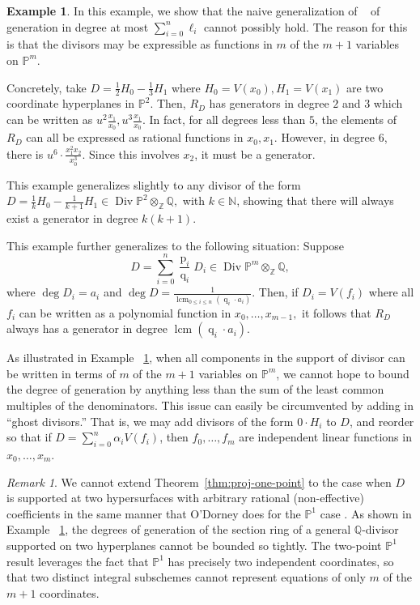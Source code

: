 \documentclass{amsart}
\theoremstyle{plain}
\theoremstyle{definition}
\newtheorem{example}[thm]{Example}
\theoremstyle{remark}
\newtheorem{rem}[thm]{Remark}
\numberwithin{equation}{section}
\newcommand\bn{{\mathbb N}}
\newcommand\bq{{\mathbb Q}}
\newcommand\bp{{\mathbb P}}
\newcommand\bz{{\mathbb Z}}
\DeclareMathOperator\di{Div}
\newcommand\bida{a}
\DeclareMathOperator{\num}{p}
\DeclareMathOperator{\den}{q}
\DeclareMathOperator{\lcm}{lcm}
\begin{document}
\begin{example}
\label{eg:hyperplane}
In this example, we show that the naive generalization of
~\cite[Theorem 8]{dorney:canonical} of generation in degree at most
$\sum_{i=0}^{n}\ell_i$ cannot possibly hold. The reason for this is
that the divisors may be
expressible as functions in $m$ of the $m+1$ variables on $\bp^m$.

Concretely, take $D = \frac{1}{2}H_0 - \frac{1}{3}H_1$ where $H_0 = V(x_0),
H_1 = V(x_1)$ are two coordinate hyperplanes in $\bp^2$. Then, $R_D$
has generators in degree $2$ and $3$ which can be written as $u^2
\frac{x_1}{x_0}, u^3 \frac{x_1}{x_0}.$ In fact, for all degrees
less than $5$, the elements of $R_D$ can all be expressed as
rational functions in $x_0, x_1$. However, in degree $6$, there is
$u^6 \cdot \frac{x_1^2 x_2}{x_0^3}$. Since this
involves $x_2$, it must be a generator.

This example generalizes slightly to any divisor of the form $D =
\frac{1}{k}H_0 - \frac{1}{k+1}H_1 \in \di \bp^2 \otimes_\bz \bq,$ with
$k \in \bn$, showing that there will always exist a generator in
degree $k(k + 1)$.

This example further generalizes to the following situation:
Suppose 
\[
	D = \sum_{i=0}^{n} \frac{\num_i}{\den_i}D_i \in \di \bp^m \otimes_\bz \bq,
\]
where $\deg D_i = \bida_i$ and $\deg D = \frac{1}{\lcm
_{0 \leq i \leq n}(\den_i \cdot \bida_i)}$. Then, if $D_i = V(f_i)$
where all $f_i$ can be written as a polynomial function in $x_0,
\ldots, x_{m-1},$ it follows that $R_D$ always has a generator in degree
$\lcm(\den_i \cdot \bida_i)$.
\end{example}

As illustrated in Example ~\ref{eg:hyperplane}, 
when all components in the support of divisor can be 
written in terms of $m$ of the $m+1$ variables on $\bp^m$,
we cannot hope to bound the degree of generation
by anything less than the sum of the least common multiples of
the denominators. This issue can easily be circumvented by adding in ``ghost
divisors.'' That is, we may add divisors of the form $0 \cdot H_i$ to
$D$, and reorder so that if $D = \sum_{i=0}^{n}\alpha_i V(f_i)$,
then $f_0, \ldots, f_m$ are independent linear functions in
$x_0,\ldots, x_m$.

\begin{rem}
\label{rem:proj-two-points}
We cannot extend Theorem~\ref{thm:proj-one-point} to the case when
$D$ is supported at two hypersurfaces with arbitrary rational (non-effective)
coefficients in the same manner that O'Dorney does for the
$\bp^1$ case \cite[Section 4]{dorney:canonical}. As shown
in Example ~\ref{eg:hyperplane}, the degrees of generation of the
section ring of a general $\bq$-divisor supported on two
hyperplanes cannot be bounded so tightly. The two-point
$\bp^1$ result leverages the fact that $\bp^1$ has precisely two
independent coordinates, so that two distinct integral subschemes
cannot represent equations of only $m$ of the $m+1$ coordinates.
\end{rem}
\end{document}
